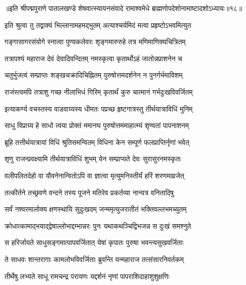 {॥इति श्रीपद्मपुराणे पातालखण्डे शेषवात्स्यायनसंवादे रामाश्वमेधे ब्राह्मणोपदेशोनामाष्टादशोऽध्यायः॥१८॥}

\resetShloka


\twolineshloka
{इति श्रुत्वा तु तद्वाक्यं भिल्लानामहमद्भुतम्}
{अत्याश्चर्यमिदं मत्वा प्रहृष्टोऽभवमित्युत}%

\twolineshloka
{गङ्गासागरसंयोगे स्नात्वा पुण्यकलेवरः}
{शृङ्गमारुरुहे तत्र मणिमाणिक्यचित्रितम्}%

\twolineshloka
{तत्रापश्यं महाराज देवं देवादिवन्दितम्}
{नमस्कृत्वा कृतार्थोऽहं जातोन्नप्राशनेन च}%

\twolineshloka
{चतुर्भुजत्वं सम्प्राप्तः शङ्खचक्रादिचिह्नितम्}
{पुरुषोत्तमदर्शनेन न पुनर्गर्भमाविशम्}%

\twolineshloka
{राजंस्त्वमपि तत्राशु गच्छ नीलाभिधं गिरिम्}
{कृतार्थं कुरु चात्मानं गर्भदुःखविवर्जितम्}%

\twolineshloka
{इत्याकर्ण्य वचस्तस्य वाडवाग्र्यस्य धीमतः}
{पप्रच्छ हृष्टगात्रस्तु तीर्थयात्राविधिं मुनिम्}%


\twolineshloka
{साधु विप्राग्र्य हे साधो त्वया प्रोक्तं ममानघ}
{पुरुषोत्तममाहात्म्यं शृण्वतां पापनाशनम्}%

\twolineshloka
{ब्रूहि तत्तीर्थयात्रायां विधिं श्रुतिसमन्वितम्}
{विधिना केन सम्पूर्ण फलप्राप्तिर्नृणां भवेत्}%


\twolineshloka
{शृणु राजन्प्रवक्ष्यामि तीर्थयात्राविधिं शुभम्}
{येन सम्प्राप्यते देवः सुरासुरनमस्कृतः}%

\twolineshloka
{वलीपलितदेहो वा यौवनेनान्वितोऽपि वा}
{ज्ञात्वा मृत्युमनिस्तीर्यं हरिं शरणमाव्रजेत्}%

\twolineshloka
{तत्कीर्तने तच्छ्रवणे वन्दने तस्य पूजने}
{मतिरेव प्रकर्तव्या नान्यत्र वनितादिषु}%

\twolineshloka
{सर्वं नश्वरमालोक्य क्षणस्थायि सुदुःखदम्}
{जन्ममृत्युजरातीतं भक्तिवल्लभमच्युतम्}%

\twolineshloka
{क्रोधात्कामाद्भयाद्द्वेषाल्लोभाद्दम्भान्नरः पुनः}
{यथाकथञ्चिद्विभजन्न स दुःखं समश्नुते}%

\twolineshloka
{स हरिर्जायते साधुसङ्गमात्पापवर्जितात्}
{येषां कृपातः पुरुषा भवन्त्यसुखवर्जिताः}%

\twolineshloka
{ते साधवः शान्तरागाः कामलोभविवर्जिताः}
{ब्रुवन्ति यन्महाराज तत्संसारनिवर्तकम्}%

\twolineshloka
{तीर्थेषु लभ्यते साधू रामचन्द्र परायणः}
{यद्दर्शनं नृणां पापराशिदाहाशुशुक्षणिः}%

